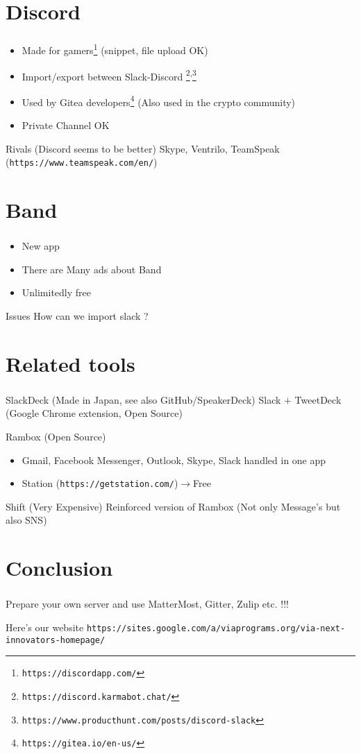 \documentclass[dvipdfmx,10pt]{beamer}
\newcommand{\bb}{\begin{block}}
\newcommand{\eb}{\end{block}}
\newcommand{\bit}{\begin{itemize}}
\newcommand{\eit}{\end{itemize}}
\newcommand{\ft}{\frametitle}
\begin{document}
\section{Discord}
\begin{frame}\ft{\insertsection}
\footnotesize
\bb{}
\bit
\item Made for gamers\footnote{\texttt{https://discordapp.com/}} (snippet, file upload OK)
\item Import/export between Slack-Discord   \footnote{\texttt{https://discord.karmabot.chat/}}\textsuperscript{,}\footnote{\texttt{https://www.producthunt.com/posts/discord-slack}}
\item Used by Gitea developers\footnote{\texttt{https://gitea.io/en-us/}} (Also used in the crypto community)
\item Private Channel OK
\eit
\eb
\bb{Rivals (Discord seems to be better)}
Skype, Ventrilo, TeamSpeak (\texttt{https://www.teamspeak.com/en/})
\eb
\normalsize
\end{frame}
\section{Band}
\begin{frame}\ft{\insertsection}
\bb{}
\bit
\item New app
\item There are Many ads about Band
\item Unlimitedly free
\eit
\eb
\bb{Issues}
How can we import slack ?
\eb
\end{frame}
\section{Related tools}
\begin{frame}\ft{\insertsection}
\bb{SlackDeck (Made in Japan, see also GitHub/SpeakerDeck)}
Slack $+$ TweetDeck (Google Chrome extension, Open Source)
\eb
\bb{Rambox (Open Source)}
\bit
\item Gmail, Facebook Messenger, Outlook, Skype, Slack handled in one app
\item Station (\texttt{https://getstation.com/})$\to$Free
\eit
\eb
\bb{Shift (Very Expensive)}
Reinforced version of Rambox (Not only Message's but also SNS)
\eb
\end{frame}
\section{Conclusion}
\begin{frame}\ft{\insertsection}
\bb{}
Prepare your own server and use MatterMost, Gitter, Zulip etc. !!!
\eb
\bb{Here's our website}
\footnotesize
\texttt{https://sites.google.com/a/viaprograms.org/via-next-innovators-homepage/}
\normalsize
\eb
\end{frame}
\end{document}
